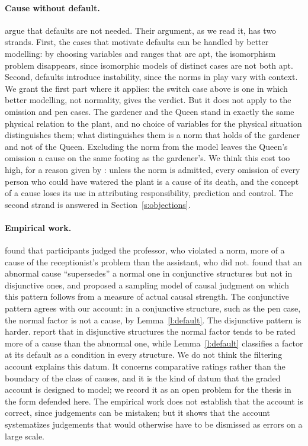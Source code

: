 \documentclass{situationist-preprint}
\begin{document}
\paragraph{Cause without default.} \citet{BlanchardSchaffer2017} argue that defaults are not needed. Their argument, as we read it, has two strands. First, the cases that motivate defaults can be handled by better modelling: by choosing variables and ranges that are apt, the isomorphism problem disappears, since isomorphic models of distinct cases are not both apt. Second, defaults introduce instability, since the norms in play vary with context. We grant the first part where it applies: the switch case above is one in which better modelling, not normality, gives the verdict. But it does not apply to the omission and pen cases. The gardener and the Queen stand in exactly the same physical relation to the plant, and no choice of variables for the physical situation distinguishes them; what distinguishes them is a norm that holds of the gardener and not of the Queen. Excluding the norm from the model leaves the Queen's omission a cause on the same footing as the gardener's. We think this cost too high, for a reason given by \citet{McGrath2005}: unless the norm is admitted, every omission of every person who could have watered the plant is a cause of its death, and the concept of a cause loses its use in attributing responsibility, prediction and control. The second strand is answered in Section~\ref{s:objections}.

\paragraph{Empirical work.} \citet{KnobeFraser2008} found that participants judged the professor, who violated a norm, more of a cause of the receptionist's problem than the assistant, who did not. \citet{Kominsky2015} found that an abnormal cause \enquote{supersedes} a normal one in conjunctive structures but not in disjunctive ones, and \citet{Icard2017} proposed a sampling model of causal judgment on which this pattern follows from a measure of actual causal strength. The conjunctive pattern agrees with our account: in a conjunctive structure, such as the pen case, the normal factor is not a cause, by Lemma~\ref{l:default}. The disjunctive pattern is harder. \citet{Icard2017} report that in disjunctive structures the normal factor tends to be rated more of a cause than the abnormal one, while Lemma~\ref{l:default} classifies a factor at its default as a condition in every structure. We do not think the filtering account explains this datum. It concerns comparative ratings rather than the boundary of the class of causes, and it is the kind of datum that the graded account is designed to model; we record it as an open problem for the thesis in the form defended here. The empirical work does not establish that the account is correct, since judgements can be mistaken; but it shows that the account systematizes judgements that would otherwise have to be dismissed as errors on a large scale.
\end{document}

